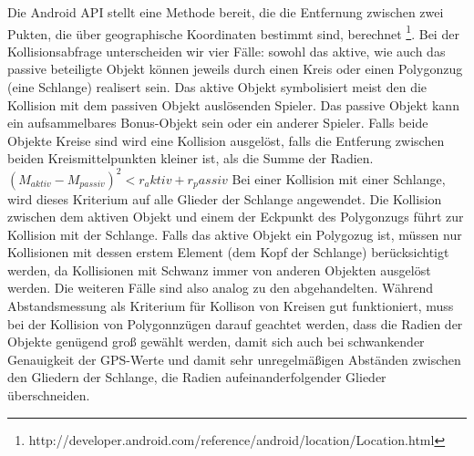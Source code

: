 Die Android API stellt eine Methode bereit, die die Entfernung zwischen zwei Pukten, die über geographische Koordinaten bestimmt sind, berechnet \footnote{http://developer.android.com/reference/android/location/Location.html}.
Bei der Kollisionsabfrage unterscheiden wir vier Fälle: sowohl das aktive, wie auch das passive beteiligte Objekt können jeweils durch einen Kreis oder einen Polygonzug (eine Schlange) realisert sein.
Das aktive Objekt symbolisiert meist den die Kollision mit dem passiven Objekt auslösenden Spieler.
Das passive Objekt kann ein aufsammelbares Bonus-Objekt sein oder ein anderer Spieler.
Falls beide Objekte Kreise sind wird eine Kollision ausgelöst, falls die Entferung zwischen beiden Kreismittelpunkten kleiner ist, als die Summe der Radien.
$(M_{aktiv}-M_{passiv})^2<r_aktiv+r_passiv$
Bei einer Kollision mit einer Schlange, wird dieses Kriterium auf alle Glieder der Schlange angewendet. Die Kollision zwischen dem aktiven Objekt und einem der Eckpunkt des Polygonzugs führt zur Kollision mit der Schlange. 
Falls das aktive Objekt ein Polygozug ist, müssen nur Kollisionen mit dessen erstem Element (dem Kopf der Schlange) berücksichtigt werden, da Kollisionen mit Schwanz immer von anderen Objekten ausgelöst werden. Die weiteren Fälle sind also analog zu den abgehandelten.
Während Abstandsmessung als Kriterium für Kollison von Kreisen gut funktioniert, muss bei der Kollision von Polygonnzügen darauf geachtet werden, dass die Radien der Objekte genügend groß gewählt werden, damit sich auch bei schwankender Genauigkeit der GPS-Werte und damit sehr unregelmäßigen Abständen zwischen den Gliedern der Schlange, die Radien aufeinanderfolgender Glieder überschneiden.